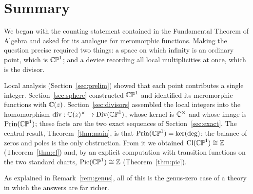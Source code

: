 \section{Summary}

We began with the counting statement contained in the Fundamental Theorem of
Algebra and asked for its analogue for meromorphic functions. Making the question
precise required two things: a space on which infinity is an ordinary point,
which is $\mathbb{CP}^1$; and a device recording all local multiplicities at once, which is
the divisor.

Local analysis (Section~\ref{sec:prelim}) showed that each point contributes a
single integer. Section~\ref{sec:sphere} constructed $\mathbb{CP}^1$ and identified its
meromorphic functions with $\mathbb{C}(z)$. Section~\ref{sec:divisors} assembled the
local integers into the homomorphism $\operatorname{div} : \mathbb{C}(z)^\times \to \operatorname{Div}(\mathbb{CP}^1)$, whose
kernel is $\mathbb{C}^\times$ and whose image is $\operatorname{Prin}(\mathbb{CP}^1)$; these facts are the two
exact sequences of Section~\ref{sec:exact}. The central result,
Theorem~\ref{thm:main}, is that $\operatorname{Prin}(\mathbb{CP}^1) = \ker(\deg)$: the balance of zeros
and poles is the only obstruction. From it we obtained $\operatorname{Cl}(\mathbb{CP}^1) \cong \mathbb{Z}$
(Theorem~\ref{thm:cl}) and, by an explicit computation with transition functions
on the two standard charts, $\operatorname{Pic}(\mathbb{CP}^1) \cong \mathbb{Z}$ (Theorem~\ref{thm:pic}).

As explained in Remark~\ref{rem:genus}, all of this is the genus-zero case of a
theory in which the answers are far richer.

